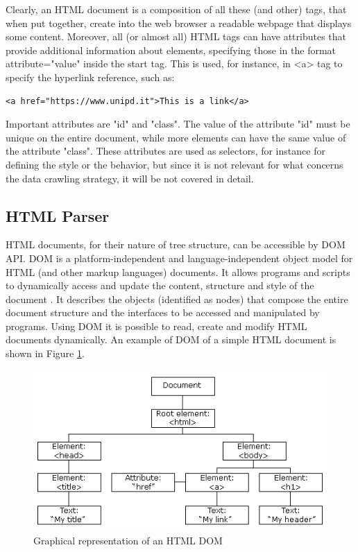 Clearly, an \ac{HTML} document is a composition of all these (and other) tags, that when put together, create into the web browser a readable webpage that displays some content. Moreover, all (or almost all) \ac{HTML} tags can have attributes that provide additional information about elements, specifying those in the format attribute="value" inside the start tag. This is used, for instance, in <a> tag to specify the hyperlink reference, such as:
\begin{lstlisting}
<a href="https://www.unipd.it">This is a link</a>
\end{lstlisting}
Important attributes are  "id" and "class". The value of the attribute "id"  must be unique on the entire document, while more elements can have the same value of the attribute "class". These attributes are used as selectors, for instance for defining the style or the behavior, but since it is not relevant for what concerns the data crawling strategy, it will be not covered in detail.\\


\subsection{HTML Parser}


HTML documents, for their nature of tree structure, can be accessible by \ac{DOM} \ac{API}. \ac{DOM} is a platform-independent and language-independent object model for HTML (and other markup languages) documents. It allows programs and scripts to dynamically access and update the content, structure and style of the document \cite{html-dom}. It describes the objects (identified as nodes) that compose the entire document structure and the interfaces to be accessed and manipulated by programs. Using \ac{DOM} it is possible to read, create and modify \ac{HTML} documents dynamically. An example of \ac{DOM} of a simple HTML document is shown in Figure \ref{fig:html-dom}.

\begin{figure}[ht]
	\centering
	\includegraphics[width=1\textwidth]{figures/html-dom.png}
	\caption{Graphical representation of an HTML DOM}
	\label{fig:html-dom}
\end{figure}

